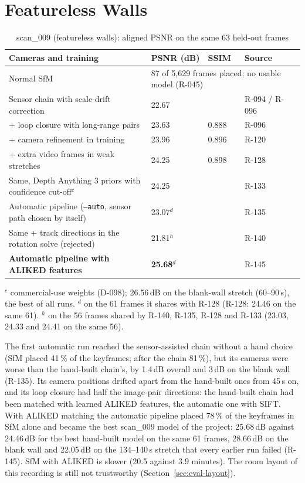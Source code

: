 \section{Featureless Walls}
\begin{table}[htbp]
\centering\small
\caption{scan\_009 (featureless walls): aligned PSNR on the same 63 held-out frames}
\label{tab:eval-featureless}
\begin{tabular}{p{6.4cm}p{1.8cm}p{1.6cm}p{2.0cm}}
\toprule
\textbf{Cameras and training} & \textbf{PSNR (dB)} & \textbf{SSIM} & \textbf{Source} \\
\midrule
Normal SfM & \multicolumn{3}{p{5.4cm}}{87 of 5{,}629 frames placed; no usable model (R-045)} \\
Sensor chain with scale-drift correction & 22.67 & & R-094 / R-096 \\
+ loop closure with long-range pairs & 23.63 & 0.888 & R-096 \\
+ camera refinement in training & 23.96 & 0.896 & R-120 \\
+ extra video frames in weak stretches & 24.25 & 0.898 & R-128 \\
Same, Depth Anything 3 priors with confidence cut-off$^c$ & 24.25 & & R-133 \\
Automatic pipeline (\texttt{--auto}, sensor path chosen by itself) & 23.07$^d$ & & R-135 \\
Same + track directions in the rotation solve (rejected) & 21.81$^h$ & & R-140 \\
\textbf{Automatic pipeline with ALIKED features} & \textbf{25.68}$^d$ & & R-145 \\
\bottomrule
\end{tabular}

\smallskip
\footnotesize $^c$ commercial-use weights (D-098); 26.56\,dB on the blank-wall stretch (60--90\,s), the best of all runs.
$^d$ on the 61 frames it shares with R-128 (R-128: 24.46 on the same 61). $^h$ on the 56 frames shared by R-140,
R-135, R-128 and R-133 (23.03, 24.33 and 24.41 on the same 56).
\end{table}
The first automatic run reached the sensor-assisted chain without a hand choice (SfM placed 41\,\% of the keyframes;
after the chain 81\,\%), but its cameras were worse than the hand-built chain's, by 1.4\,dB overall and 3\,dB on the
blank wall (R-135). Its camera positions drifted apart from the hand-built ones from 45\,s on, and its loop closure had
half the image-pair directions: the hand-built chain had been matched with learned ALIKED features, the automatic one
with SIFT. With ALIKED matching the automatic pipeline placed 78\,\% of the keyframes in SfM alone and became the best
scan\_009 model of the project: 25.68\,dB against 24.46\,dB for the best hand-built model on the same 61 frames,
28.66\,dB on the blank wall and 22.05\,dB on the 134--140\,s stretch that every earlier run failed (R-145). SfM with
ALIKED is slower (20.5 against 3.9 minutes). The room layout of this recording is still not trustworthy
(Section~\ref{sec:eval-layout}).

